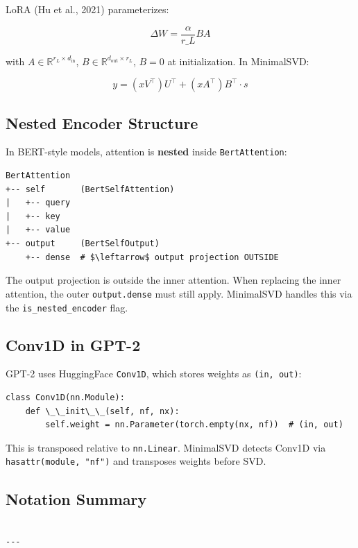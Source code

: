 LoRA (Hu et al., 2021) parameterizes:

\[
\Delta W = \frac{\alpha}{r\_L} B A
\tag{3.10}
\]

with $A \in \mathbb{R}^{r_L \times d_\text{in}}$, $B \in \mathbb{R}^{d_\text{out} \times r_L}$, 
$B = 0$ at initialization. In MinimalSVD:

\[
y = (x V^\top) U^\top + (x A^\top) B^\top \cdot s
\tag{3.11}
\]

\subsection{Nested Encoder Structure}

In BERT-style models, attention is \textbf{nested} inside \texttt{BertAttention}:

\begin{lstlisting}
BertAttention
+-- self       (BertSelfAttention)
|   +-- query
|   +-- key
|   +-- value
+-- output     (BertSelfOutput)
    +-- dense  # $\leftarrow$ output projection OUTSIDE
\end{lstlisting}

The output projection is outside the inner attention. When replacing the 
inner attention, the outer \texttt{output.dense} must still apply. MinimalSVD 
handles this via the \texttt{is\_nested\_encoder} flag.

\subsection{Conv1D in GPT-2}

GPT-2 uses HuggingFace \texttt{Conv1D}, which stores weights as \texttt{(in, out)}:

\begin{lstlisting}
class Conv1D(nn.Module):
    def \_\_init\_\_(self, nf, nx):
        self.weight = nn.Parameter(torch.empty(nx, nf))  # (in, out)
\end{lstlisting}

This is transposed relative to \texttt{nn.Linear}. MinimalSVD detects Conv1D via 
\texttt{hasattr(module, "nf")} and transposes weights before SVD.

\subsection{Notation Summary}

\begin{lstlisting}

---
\end{lstlisting}